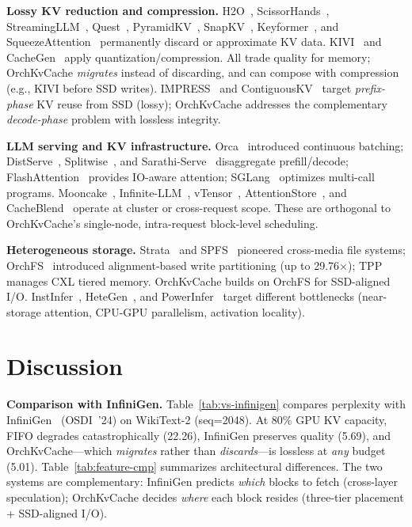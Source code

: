 \documentclass[conference]{IEEEtran}
\begin{document}
\textbf{Lossy KV reduction and compression.}
H2O~\cite{h2o}, ScissorHands~\cite{scissorhands}, StreamingLLM~\cite{streamingllm}, Quest~\cite{quest}, PyramidKV~\cite{pyramidkv}, SnapKV~\cite{snapkv}, Keyformer~\cite{keyformer}, and SqueezeAttention~\cite{squeezeattention} permanently discard or approximate KV data. KIVI~\cite{kivi} and CacheGen~\cite{cachegen} apply quantization/compression. All trade quality for memory; OrchKvCache \emph{migrates} instead of discarding, and can compose with compression (e.g., KIVI before SSD writes). IMPRESS~\cite{impress} and ContiguousKV~\cite{contiguouskv} target \emph{prefix-phase} KV reuse from SSD (lossy); OrchKvCache addresses the complementary \emph{decode-phase} problem with lossless integrity.

\textbf{LLM serving and KV infrastructure.}
Orca~\cite{orca} introduced continuous batching; DistServe~\cite{distserve}, Splitwise~\cite{splitwise}, and Sarathi-Serve~\cite{sarathi} disaggregate prefill/decode; FlashAttention~\cite{flashattn,flashattn2} provides IO-aware attention; SGLang~\cite{sglang} optimizes multi-call programs. Mooncake~\cite{mooncake}, Infinite-LLM~\cite{infinitellm}, vTensor~\cite{vtensor}, AttentionStore~\cite{attentionstore}, and CacheBlend~\cite{cacheblend} operate at cluster or cross-request scope. These are orthogonal to OrchKvCache's single-node, intra-request block-level scheduling.

\textbf{Heterogeneous storage.}
Strata~\cite{strata} and SPFS~\cite{spfs} pioneered cross-media file systems; OrchFS~\cite{orchfs} introduced alignment-based write partitioning (up to 29.76$\times$); TPP~\cite{tpp} manages CXL tiered memory. OrchKvCache builds on OrchFS for SSD-aligned I/O. InstInfer~\cite{instinfer}, HeteGen~\cite{hetegen}, and PowerInfer~\cite{powerinfer} target different bottlenecks (near-storage attention, CPU-GPU parallelism, activation locality).

\section{Discussion}
\label{sec:discussion}

\textbf{Comparison with InfiniGen.}
Table~\ref{tab:vs-infinigen} compares perplexity with InfiniGen~\cite{infinigen} (OSDI~'24) on WikiText-2 (seq=2048). At 80\% GPU KV capacity, FIFO degrades catastrophically (22.26), InfiniGen preserves quality (5.69), and OrchKvCache---which \emph{migrates} rather than \emph{discards}---is lossless at \emph{any} budget (5.01). Table~\ref{tab:feature-cmp} summarizes architectural differences. The two systems are complementary: InfiniGen predicts \emph{which} blocks to fetch (cross-layer speculation); OrchKvCache decides \emph{where} each block resides (three-tier placement + SSD-aligned I/O).
\end{document}
